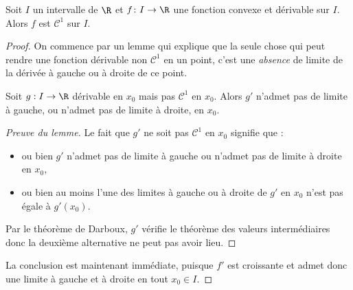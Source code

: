 \documentclass{notes}
\begin{document}

\begin{theo*}
  Soit $I$ un intervalle de $\R$ et $f\colon I\to \R$ une fonction convexe et dérivable sur $I$. Alors $f$ est $\mathcal{C}^{1}$ sur $I$.
\end{theo*}

\begin{proof}
  On commence par un lemme qui explique que la seule chose qui peut rendre une fonction dérivable non $\mathcal{C}^{1}$ en un point, c'est une \emph{absence} de limite de la dérivée à gauche ou à droite de ce point.
  \begin{lemm*}
    Soit $g:I\to \R$ dérivable en $x_0$ mais pas $\mathcal{C}^{1}$ en $x_0$. Alors $g'$ n'admet pas de limite à gauche, ou n'admet pas de limite à droite, en $x_0$.
  \end{lemm*}
  \begin{proof}[Preuve du lemme]
    Le fait que $g'$ ne soit pas $\mathcal{C}^{1}$ en $x_0$ signifie que :
    \begin{itemize}
      \item ou bien $g'$ n'admet pas de limite à gauche ou n'admet pas de limite à droite en $x_0$,
      \item ou bien au moins l'une des limites à gauche ou à droite de $g'$ en $x_0$ n'est pas égale à $g'(x_0)$.
    \end{itemize}
    Par le théorème de Darboux, $g'$ vérifie le théorème des valeurs intermédiaires donc la deuxième alternative ne peut pas avoir lieu.
  \end{proof}

  La conclusion est maintenant immédiate, puisque $f'$ est croissante et admet donc une limite à gauche et à droite en tout $x_0\in I$.

\end{proof}



 
\end{document}
